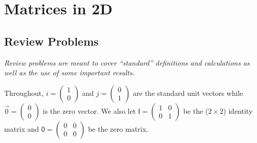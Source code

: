\section{Matrices in 2D}

\subsection{Review Problems}

\emph{Review problems are meant to cover ``standard'' definitions and calculations as well as the use of some important results.}

Throughout, $\unit{i} = \begin{pmatrix} 1 \\ 0 \end{pmatrix}$ and $\unit{j} = \begin{pmatrix} 0 \\ 1 \end{pmatrix}$ are the standard unit vectors while $\vec{0} = \begin{pmatrix} 0 \\ 0 \end{pmatrix}$ is the zero vector. We also let $\mathsf{I} = \begin{pmatrix} 1 & 0 \\ 0 & 1 \end{pmatrix}$ be the ($2\times 2$) identity matrix and $\mathsf{0} = \begin{pmatrix} 0 & 0 \\ 0 & 0 \end{pmatrix}$ be the zero matrix.

